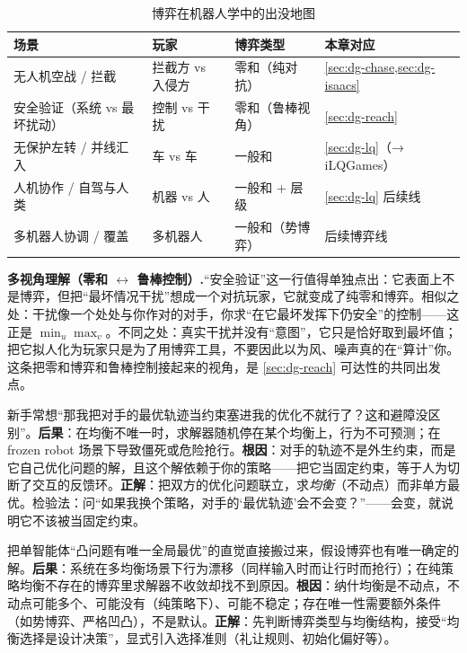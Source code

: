 \begin{table}[H]\centering\small
\caption{博弈在机器人学中的出没地图}
\label{tab:dg-map}
\begin{tabular}{p{} p{} p{} p{}}
\toprule
场景 & 玩家 & 博弈类型 & 本章对应 \\
\midrule
无人机空战 / 拦截 & 拦截方 vs 入侵方 & 零和（纯对抗） & \cref{sec:dg-chase,sec:dg-isaacs} \\
安全验证（系统 vs 最坏扰动） & 控制 vs 干扰 & 零和（鲁棒视角） & \cref{sec:dg-reach} \\
无保护左转 / 并线汇入 & 车 vs 车 & 一般和 & \cref{sec:dg-lq}（→ iLQGames） \\
人机协作 / 自驾与人类 & 机器 vs 人 & 一般和 + 层级 & \cref{sec:dg-lq} 后续线 \\
多机器人协调 / 覆盖 & 多机器人 & 一般和（势博弈） & 后续博弈线 \\
\bottomrule
\end{tabular}
\end{table}

\begin{note}
\textbf{多视角理解（零和 $\leftrightarrow$ 鲁棒控制）.}\;“安全验证”这一行值得单独点出：它表面上不是博弈，但把“最坏情况干扰”想成一个对抗玩家，它就变成了纯零和博弈。相似之处：干扰像一个处处与你作对的对手，你求“在它最坏发挥下仍安全”的控制——这正是 $\min_u\max_v$。不同之处：真实干扰并没有“意图”，它只是恰好取到最坏值；把它拟人化为玩家只是为了用博弈工具，不要因此以为风、噪声真的在“算计”你。这条把零和博弈和鲁棒控制接起来的视角，是 \cref{sec:dg-reach} 可达性的共同出发点。
\end{note}

\begin{pitfall}
新手常想“那我把对手的最优轨迹当约束塞进我的优化不就行了？这和避障没区别”。\textbf{后果}：在均衡不唯一时，求解器随机停在某个均衡上，行为不可预测；在 frozen robot 场景下导致僵死或危险抢行。\textbf{根因}：对手的轨迹不是外生约束，而是它自己优化问题的解，且这个解依赖于你的策略——把它当固定约束，等于人为切断了交互的反馈环。\textbf{正解}：把双方的优化问题联立，求\emph{均衡}（不动点）而非单方最优。检验法：问“如果我换个策略，对手的‘最优轨迹’会不会变？”——会变，就说明它不该被当固定约束。
\end{pitfall}

\begin{pitfall}
把单智能体“凸问题有唯一全局最优”的直觉直接搬过来，假设博弈也有唯一确定的解。\textbf{后果}：系统在多均衡场景下行为漂移（同样输入时而让行时而抢行）；在纯策略均衡不存在的博弈里求解器不收敛却找不到原因。\textbf{根因}：纳什均衡是不动点，不动点可能多个、可能没有（纯策略下）、可能不稳定；存在唯一性需要额外条件（如势博弈、严格凹凸），不是默认。\textbf{正解}：先判断博弈类型与均衡结构，接受“均衡选择是设计决策”，显式引入选择准则（礼让规则、初始化偏好等）。
\end{pitfall}

